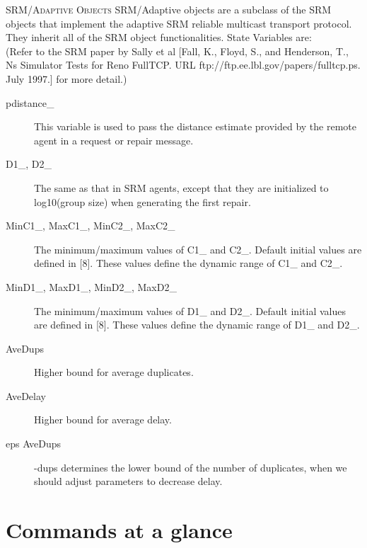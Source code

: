 \textsc{SRM/Adaptive Objects}
SRM/Adaptive objects are a subclass of the SRM objects that implement the
adaptive SRM reliable multicast transport protocol. They inherit all of
the SRM object functionalities. 
State Variables are: \\
(Refer to the SRM paper by Sally et al [Fall, K., Floyd, S., and
Henderson, T., Ns Simulator Tests for Reno FullTCP. URL
ftp://ftp.ee.lbl.gov/papers/fulltcp.ps. July 1997.] for more detail.)
\begin{description}

\item[pdistance\_]
This variable is used to pass the distance estimate provided by the remote
agent in a request or repair message. 

\item[D1\_, D2\_]
The same as that in SRM agents, except that they are initialized to
log10(group size) when generating the first repair. 

\item[MinC1\_, MaxC1\_, MinC2\_, MaxC2\_]
The minimum/maximum values of C1\_ and C2\_. Default initial values are
defined in [8]. These values define the dynamic range of C1\_ and C2\_. 

\item[MinD1\_, MaxD1\_, MinD2\_, MaxD2\_]
The minimum/maximum values of D1\_ and D2\_. Default initial values are
defined in [8]. These values define the dynamic range of D1\_ and D2\_. 

\item[AveDups]
Higher bound for average duplicates. 

\item[AveDelay]
Higher bound for average delay. 

\item[eps AveDups] -dups determines the lower bound of the number of
duplicates, when we should adjust parameters to decrease delay. 
\end{description}


\section{Commands at a glance}
\label{sec:srmcommand}

